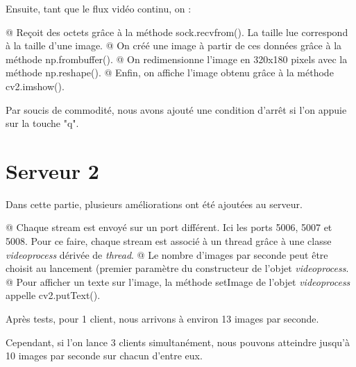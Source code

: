 \documentclass{report}
\begin{document}
			Ensuite, tant que le flux vidéo continu, on :
			\begin{easylist}[itemize]
				@ Reçoit des octets grâce à la méthode sock.recvfrom(). La taille lue correspond à la taille d'une image.
				@ On créé une image à partir de ces données grâce à la méthode np.frombuffer().
				@ On redimensionne l'image en 320x180 pixels avec la méthode np.reshape().
				@ Enfin, on affiche l'image obtenu grâce à la méthode cv2.imshow().
			\end{easylist}
	
			Par soucis de commodité, nous avons ajouté une condition d'arrêt si l'on appuie sur la touche "q".
	
		\section{Serveur 2}
			Dans cette partie, plusieurs améliorations ont été ajoutées au serveur.
	
			\begin{easylist}[itemize]
				@ Chaque stream est envoyé sur un port différent. Ici les ports 5006, 5007 et 5008. Pour ce faire, chaque stream est associé à un thread grâce à une classe \textit{videoprocess} dérivée de \textit{thread}.
				@ Le nombre d'images par seconde peut être choisit au lancement (premier paramètre du constructeur de l'objet \textit{videoprocess}.
				@ Pour afficher un texte sur l'image, la méthode setImage de l'objet \textit{videoprocess} appelle cv2.putText().
			\end{easylist}
	
			Après tests, pour 1 client, nous arrivons à environ 13 images par seconde.
			
			Cependant, si l'on lance 3 clients simultanément, nous pouvons atteindre jusqu'à 10 images par seconde sur chacun d'entre eux.
		
\end{document}
